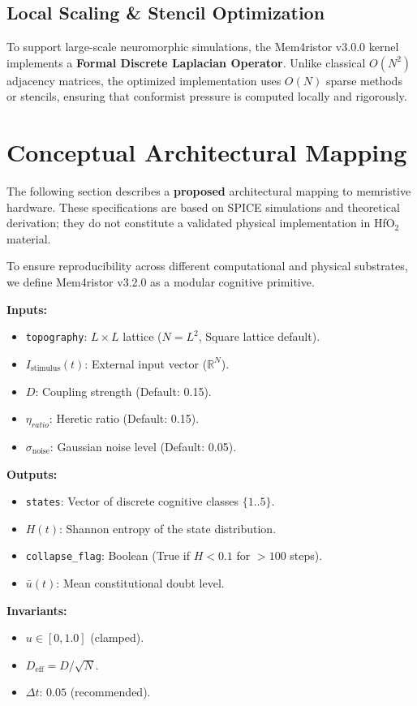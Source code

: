 \documentclass[11pt]{article}
\begin{document}
\subsection{Local Scaling \& Stencil Optimization}
To support large-scale neuromorphic simulations, the Mem4ristor v3.0.0 kernel implements a \textbf{Formal Discrete Laplacian Operator}. Unlike classical $O(N^2)$ adjacency matrices, the optimized implementation uses $O(N)$ sparse methods or stencils, ensuring that conformist pressure is computed locally and rigorously.

\section{Conceptual Architectural Mapping}

\begin{tcolorbox}[colback=red!5,colframe=red!75,title=Disclaimer: Conceptual Mapping]
The following section describes a \textbf{proposed} architectural mapping to memristive hardware. These specifications are based on SPICE simulations and theoretical derivation; they do not constitute a validated physical implementation in HfO$_2$ material.
\end{tcolorbox}

To ensure reproducibility across different computational and physical substrates, we define Mem4ristor v3.2.0 as a modular cognitive primitive.

\begin{tcolorbox}[colback=blue!5,colframe=blue!75,title=Interface Contract: Mem4ristor v3.2.0]
\small
\textbf{Inputs:}
\begin{itemize}
    \item \texttt{topography}: $L \times L$ lattice ($N=L^2$, Square lattice default).
    \item $I_{\text{stimulus}}(t)$: External input vector ($\mathbb{R}^N$).
    \item $D$: Coupling strength (Default: 0.15).

    \item $\eta_{ratio}$: Heretic ratio (Default: 0.15).
    \item $\sigma_{\text{noise}}$: Gaussian noise level (Default: 0.05).
\end{itemize}
\textbf{Outputs:}
\begin{itemize}
    \item \texttt{states}: Vector of discrete cognitive classes $\{1..5\}$.
    \item $H(t)$: Shannon entropy of the state distribution.
    \item \texttt{collapse\_flag}: Boolean (True if $H < 0.1$ for $>100$ steps).
    \item $\bar{u}(t)$: Mean constitutional doubt level.
\end{itemize}
\textbf{Invariants:}
\begin{itemize}
    \item $u \in [0, 1.0]$ (clamped).
    \item $D_{\text{eff}} = D / \sqrt{N}$.
    \item $\Delta t$: $0.05$ (recommended).
\end{itemize}
\end{tcolorbox}
\end{document}
